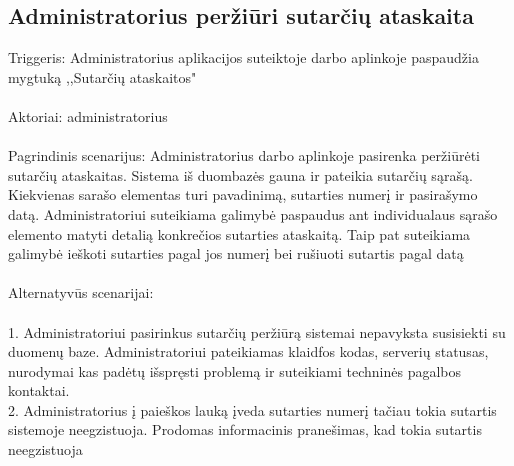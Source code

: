\documentclass[oneside]{VUMIFPSkursinis}
\begin{document}
\subsection{Administratorius peržiūri sutarčių ataskaita}
	Triggeris: Administratorius aplikacijos suteiktoje darbo aplinkoje paspaudžia mygtuką ,,Sutarčių ataskaitos"\\ \\
	Aktoriai: administratorius \\ \\
	Pagrindinis scenarijus: Administratorius darbo aplinkoje pasirenka peržiūrėti sutarčių ataskaitas. Sistema iš duombazės gauna ir pateikia sutarčių sąrašą. Kiekvienas sarašo elementas turi pavadinimą, sutarties numerį ir pasirašymo datą. Administratoriui suteikiama galimybė paspaudus ant individualaus sąrašo elemento matyti detalią konkrečios sutarties ataskaitą. Taip pat suteikiama galimybė ieškoti sutarties pagal jos numerį bei rušiuoti sutartis pagal datą \\ \\
	Alternatyvūs scenarijai: \\ \\
1. Administratoriui pasirinkus sutarčių peržiūrą sistemai nepavyksta susisiekti su duomenų baze. Administratoriui pateikiamas klaidfos kodas, serverių statusas, nurodymai kas padėtų išspręsti problemą ir suteikiami techninės pagalbos kontaktai. \\ 
2. Administratorius į paieškos lauką įveda sutarties numerį tačiau tokia sutartis sistemoje neegzistuoja. Prodomas informacinis pranešimas, kad tokia sutartis neegzistuoja \\ \\
\end{document}
